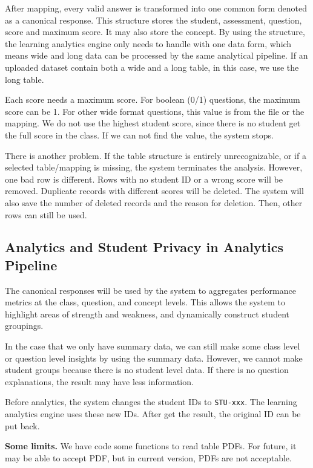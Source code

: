 \documentclass[11pt,a4paper]{article}
\begin{document}
After mapping, every valid answer is transformed into one common form denoted as a canonical response. This structure stores the student, assessment, question, score and maximum score. It may also store the concept. By using the structure, the learning analytics engine only needs to handle with one data form, which means wide and long data can be processed by the same analytical pipeline. If an uploaded dataset contain both a wide and a long table, in this case, we use the long table.

Each score needs a maximum score. For boolean (0/1) questions, the maximum score can be 1. For other wide format questions, this value is from the file or the mapping. We do not use the highest student score, since there is no student get the full score in the class. If we can not find the value, the system stops.

There is another problem. If the table structure is entirely unrecognizable, or if a selected table/mapping is missing, the system terminates the analysis. However, one bad row is different. Rows with no student ID or a wrong score will be removed. Duplicate records with different scores will be deleted. The system will also save the number of deleted records and the reason for deletion. Then, other rows can still be used. 

\subsection{Analytics and Student Privacy in Analytics Pipeline}

The canonical responses will be used by the system to aggregates performance metrics at the class, question, and concept levels. This allows the system to highlight areas of strength and weakness, and dynamically construct student groupings.

In the case that we only have summary data, we can still make some class level or question level insights by using the summary data. However, we cannot make student groups because there is no student level data. If there is no question explanations, the result may have less information.

Before analytics, the system changes the student IDs to \texttt{STU-xxx}. The learning analytics engine uses these new IDs. After get the result, the original ID can be put back.

\textbf{Some limits.} We have code some functions to read table PDFs. For future, it may be able to accept PDF, but in current version, PDFs are not acceptable.
\end{document}
